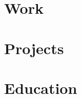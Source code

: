 \documentclass[12pt, a4paper, sans, obeyspaces, unicode]{moderncv}
\begin{document}
\maketitle

\vspace*{-1cm}

\section{Work}
    

\section{Projects}
    

\section{Education}
    


\end{document}
